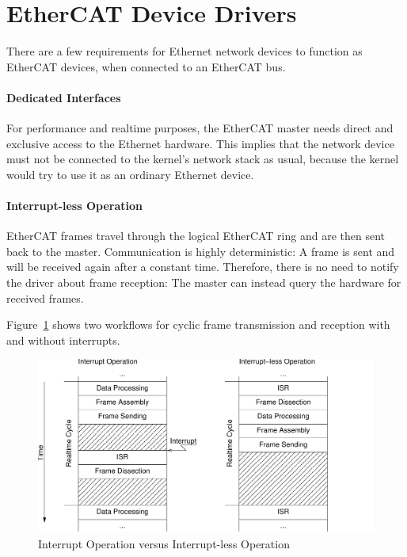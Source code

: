 \documentclass[a4paper,12pt,BCOR6mm,bibtotoc,idxtotoc]{scrbook}
\begin{document}

\section{EtherCAT Device Drivers}
\label{sec:requirements}

There are a few requirements for Ethernet network devices to function as
EtherCAT devices, when connected to an EtherCAT bus.

\paragraph{Dedicated Interfaces}

For performance and realtime purposes, the EtherCAT master needs direct and
exclusive access to the Ethernet hardware. This implies that the network
device must not be connected to the kernel's network stack as usual, because
the kernel would try to use it as an ordinary Ethernet device.

\paragraph{Interrupt-less Operation}

EtherCAT frames travel through the logical EtherCAT ring and are then sent
back to the master. Communication is highly deterministic: A frame is sent and
will be received again after a constant time.  Therefore, there is no need to
notify the driver about frame reception: The master can instead query the
hardware for received frames.

Figure~\ref{fig:interrupt} shows two workflows for cyclic frame transmission
and reception with and without interrupts.

\begin{figure}[htbp]
  \centering
  \includegraphics[width=.8\textwidth]{images/interrupt}
  \caption{Interrupt Operation versus Interrupt-less Operation}
  \label{fig:interrupt}
\end{figure}
\end{document}
